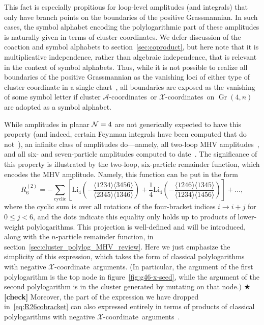 \documentclass[12pt]{article}
\DeclareMathOperator{\Gr}{Gr}
\def\xcoord{$\mathcal{X}$-coordinate}
\def\xcoords{$\mathcal{X}$-coordinates}
\def\acoords{$\mathcal{A}$-coordinates}
\def\draftnote#1{{\color{red} $\bigstar$ }{\bf [#1]}}
\begin{document}
This fact is especially propitious for loop-level amplitudes (and integrals) that only have branch points on the boundaries of the positive Grassmannian. In such cases, the symbol alphabet encoding the polylogarithmic part of these amplitudes is naturally given in terms of cluster coordinates. We defer discussion of the coaction and symbol alphabets to section~\ref{sec:coproduct}, but here note that it is multiplicative independence, rather than algebraic independence, that is relevant in the context of symbol alphabets. Thus, while it is not possible to realize all boundaries of the positive Grassmannian as the vanishing loci of either type of cluster coordinate in a single chart~\cite{ArkaniHamed:2012nw}, all boundaries are exposed as the vanishing of some symbol letter if cluster \acoords\ or \xcoords\ on $\Gr(4,n)$ are adopted as a symbol alphabet.

While amplitudes in planar ${\cal N}=4$ are not generically expected to have this property (and indeed, certain Feynman integrals have been computed that do not~\cite{Bourjaily:2018aeq,Henn:2018cdp}), an infinite class of amplitudes do---namely, all two-loop MHV amplitudes~\cite{CaronHuot:2011ky}, and all six- and seven-particle amplitudes computed to date~\cite{CaronHuot:2011kk,Dixon:2014iba,Drummond:2014ffa,Dixon:2015iva,Caron-Huot:2016owq,Dixon:2016nkn}. The significance of this property is illustrated by the two-loop, six-particle remainder function, which encodes the MHV amplitude. Namely, this function can be put in the form
\begin{equation} \label{eq:R26cobracket}
	R^{(2)}_6 = -\sum_{\text{cyclic}} \left[ \text{Li}_4\left(-\frac{\langle 1234 \rangle \langle 3456 \rangle}{\langle 2345 \rangle \langle 1346 \rangle}\right) + \frac{1}{4} \text{Li}_4 \left(-\frac{\langle 1246 \rangle \langle 1345 \rangle}{\langle 1234 \rangle \langle 1456 \rangle}\right) \right] + \dots,
\end{equation}
where the cyclic sum is over all rotations of the four-bracket indices $i \rightarrow i+j$ for $0\leq j <6$, and the dots indicate this equality only holds up to products of lower-weight polylogarithms. This projection is well-defined and will be introduced, along with the $n$-particle remainder function, in section~\ref{sec:cluster_polylog_MHV_review}. Here we just emphasize the simplicity of this expression, which takes the form of classical polylogarithms with negative \xcoord\ arguments. (In particular, the argument of the first polylogarithm is the top node in figure~\ref{fig:g46-x-seed}, while the argument of the second polylogarithm is in the cluster generated by mutating on that node.)\draftnote{check} Moreover, the part of the expression we have dropped in~\eqref{eq:R26cobracket} can also expressed entirely in terms of products of classical polylogarithms with negative \xcoord\ arguments~\cite{Golden:2014xqf}. 
\end{document}
